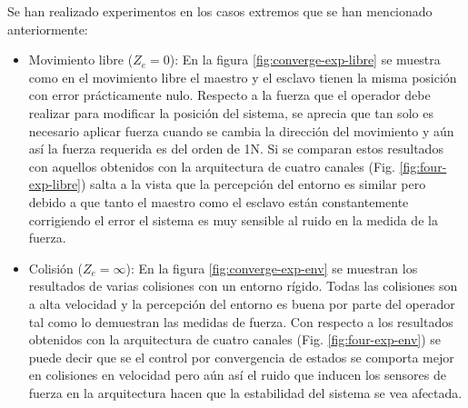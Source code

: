 Se han realizado experimentos en los casos extremos que se han mencionado anteriormente:
\begin{itemize}
\item Movimiento libre ($Z_e = 0$): En la figura \ref{fig:converge-exp-libre} se muestra como en el movimiento libre el maestro y el esclavo tienen la misma posición con error prácticamente nulo. Respecto a la fuerza que el operador debe realizar para modificar la posición del sistema, se aprecia que tan solo es necesario aplicar fuerza cuando se cambia la dirección del movimiento y aún así la fuerza requerida es del orden de 1N. Si se comparan estos resultados con aquellos obtenidos con la arquitectura de cuatro canales (Fig. \ref{fig:four-exp-libre}) salta a la vista que la percepción del entorno es similar pero debido a que tanto el maestro como el esclavo están constantemente corrigiendo el error el sistema es muy sensible al ruido en la medida de la fuerza.

\item Colisión ($Z_e = \infty$): En la figura \ref{fig:converge-exp-env} se muestran los resultados de varias colisiones con un entorno rígido. Todas las colisiones son a alta velocidad y la percepción del entorno es buena por parte del operador tal como lo demuestran las medidas de fuerza. Con respecto a los resultados obtenidos con la arquitectura de cuatro canales (Fig. \ref{fig:four-exp-env}) se puede decir que se el control por convergencia de estados se comporta mejor en colisiones en velocidad pero aún así el ruido que inducen los sensores de fuerza en la arquitectura hacen que la estabilidad del sistema se vea afectada.
\end{itemize}